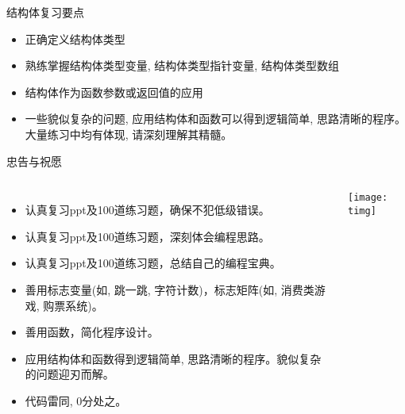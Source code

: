 \begin{frame}{结构体复习要点}
\begin{itemize}
	\item 正确定义结构体类型
	\item 熟练掌握结构体类型变量, 结构体类型指针变量, 结构体类型数组
	\item 结构体作为函数参数或返回值的应用
	\item 一些貌似复杂的问题, 应用结构体和函数可以得到逻辑简单, 思路清晰的程序。大量练习中均有体现, 请深刻理解其精髓。
\end{itemize}
\end{frame}

\begin{frame}{忠告与祝愿}
\vspace{-0.2cm}
\begin{columns}
	\begin{itemize}
		\item 认真复习ppt及100道练习题，确保不犯低级错误。
		\item 认真复习ppt及100道练习题，深刻体会编程思路。
		\item 认真复习ppt及100道练习题，总结自己的编程宝典。
		\item 善用标志变量(如, 跳一跳, 字符计数)，标志矩阵(如, 消费类游戏, 购票系统)。
		\item 善用函数，简化程序设计。
		\item 应用结构体和函数得到逻辑简单, 思路清晰的程序。貌似复杂的问题迎刃而解。
		\item 代码雷同, 0分处之。 
	\end{itemize}
	\centering\texttt{[image: timg]}
\end{columns}
\end{frame}

